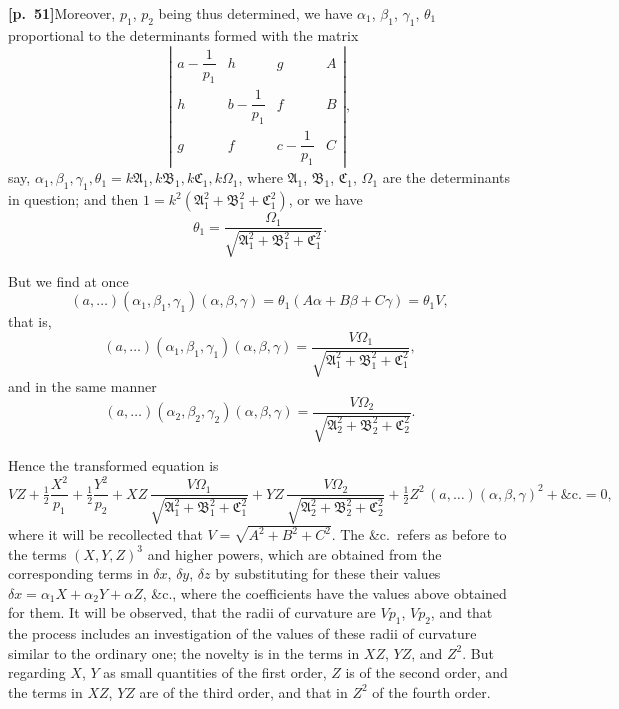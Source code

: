 \documentclass[11pt,a4paper]{article}
\begin{document}
\noindent\textbf{[p.~51]}\quad Moreover, $p_{1}$, $p_{2}$ being thus determined, we have $\alpha_{1}$, $\beta_{1}$, $\gamma_{1}$, $\theta_{1}$ proportional to the determinants formed with the matrix
\[
\left|\begin{array}{cccc}
a - \dfrac{1}{p_{1}} & h & g & A \\[0.3em]
h & b - \dfrac{1}{p_{1}} & f & B \\[0.3em]
g & f & c - \dfrac{1}{p_{1}} & C
\end{array}\right|,
\]
say, $\alpha_{1}, \beta_{1}, \gamma_{1}, \theta_{1} = k\mathfrak{A}_{1}, k\mathfrak{B}_{1}, k\mathfrak{C}_{1}, k\Omega_{1}$, where $\mathfrak{A}_{1}$, $\mathfrak{B}_{1}$, $\mathfrak{C}_{1}$, $\Omega_{1}$ are the determinants in question; and then $1 = k^{2}(\mathfrak{A}_{1}^{2} + \mathfrak{B}_{1}^{2} + \mathfrak{C}_{1}^{2})$, or we have
\[
\theta_{1} = \frac{\Omega_{1}}{\sqrt{\mathfrak{A}_{1}^{2} + \mathfrak{B}_{1}^{2} + \mathfrak{C}_{1}^{2}}}.
\]

But we find at once
\[
(a, \ldots)(\alpha_{1}, \beta_{1}, \gamma_{1})(\alpha, \beta, \gamma) = \theta_{1}(A\alpha + B\beta + C\gamma) = \theta_{1}V,
\]
that is,
\[
(a, \ldots)(\alpha_{1}, \beta_{1}, \gamma_{1})(\alpha, \beta, \gamma) = \frac{V\Omega_{1}}{\sqrt{\mathfrak{A}_{1}^{2} + \mathfrak{B}_{1}^{2} + \mathfrak{C}_{1}^{2}}},
\]
and in the same manner
\[
(a, \ldots)(\alpha_{2}, \beta_{2}, \gamma_{2})(\alpha, \beta, \gamma) = \frac{V\Omega_{2}}{\sqrt{\mathfrak{A}_{2}^{2} + \mathfrak{B}_{2}^{2} + \mathfrak{C}_{2}^{2}}}.
\]

Hence the transformed equation is
\[
VZ + \tfrac{1}{2}\frac{X^{2}}{p_{1}} + \tfrac{1}{2}\frac{Y^{2}}{p_{2}}
+ XZ\,\frac{V\Omega_{1}}{\sqrt{\mathfrak{A}_{1}^{2} + \mathfrak{B}_{1}^{2} + \mathfrak{C}_{1}^{2}}}
+ YZ\,\frac{V\Omega_{2}}{\sqrt{\mathfrak{A}_{2}^{2} + \mathfrak{B}_{2}^{2} + \mathfrak{C}_{2}^{2}}}
+ \tfrac{1}{2}Z^{2}\,(a, \ldots)(\alpha, \beta, \gamma)^{2} + \&\text{c.} = 0,
\]
where it will be recollected that $V = \sqrt{A^{2} + B^{2} + C^{2}}$. The \&c.\ refers as before to the terms $(X, Y, Z)^{3}$ and higher powers, which are obtained from the corresponding terms in $\delta x$, $\delta y$, $\delta z$ by substituting for these their values $\delta x = \alpha_{1}X + \alpha_{2}Y + \alpha Z$, \&c., where the coefficients have the values above obtained for them. It will be observed, that the radii of curvature are $V p_{1}$, $V p_{2}$, and that the process includes an investigation of the values of these radii of curvature similar to the ordinary one; the novelty is in the terms in $XZ$, $YZ$, and $Z^{2}$. But regarding $X$, $Y$ as small quantities of the first order, $Z$ is of the second order, and the terms in $XZ$, $YZ$ are of the third order, and that in $Z^{2}$ of the fourth order.
\end{document}
